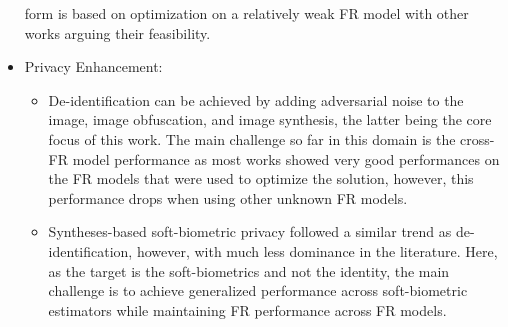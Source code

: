 \documentclass[12pt]{article}
\begin{document}
\begin{itemize}
  form is based on optimization on a relatively weak
  FR model with other works arguing their feasibility.
  \item Privacy Enhancement: 
  \begin{itemize}
    \item De-identification can be achieved by adding
    adversarial noise to the image, image obfuscation,
    and image synthesis, the latter being the core focus
    of this work. The main challenge so far
    in this domain is the cross-FR model performance as
    most works showed very good performances on the
    FR models that were used to optimize the solution,
    however, this performance drops when using other
    unknown FR models. 
    \item Syntheses-based soft-biometric
    privacy followed a similar trend as de-identification,
    however, with much less dominance in the literature. Here, as
    the target is the soft-biometrics and not the identity,
    the main challenge is to achieve generalized performance across soft-biometric estimators while maintaining FR performance across FR models.    
  \end{itemize}
\end{itemize}
\end{document}
